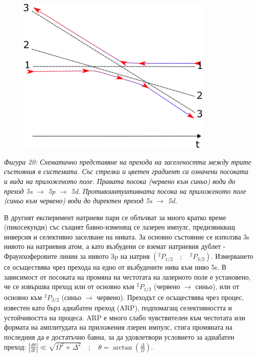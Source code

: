     \begin{figure}[H]
        \centering
        \includegraphics[width=270pt]{11.png}
    \end{figure}
    \begin{center}
        \small \textit{Фигура 20: Схематично представяне на прехода на заселеността между трите състояния в системата. Със стрелки и цветен градиент са означени посоката и вида
        на приложеното поле. Правата посока (червено към синьо) води до преход 5s $\rightarrow$ 5p $\rightarrow$ 5d. Противоинтуитивната посока на приложеното поле
        (синьо към червено) води до директен преход 5s $\rightarrow$ 5d.}\\
    \end{center}

    В другият експеримент натриеви пари се облъчват за много кратко време (пикосекунди) със същият бавно-изменящ се лазерен импулс, предизвикващ инверсия и селективно заселване на
    нивата. За основно състояние се използва 3s нивото на натриевия атом, а като възбудени се вземат натриевия дублет - Фраунхоферовите линии за нивото 3p на натрия $(^2P_{1/2} \quad ; \quad ^2P_{3/2})$.
    Измерването се осъществява чрез прехода на едно от възбудените нива към ниво 5s. В зависимост от посоката на промяна на честотата на лазерното поле е установено, че се извършва преход или от основно
    към $^2P_{1/2}$ (червено $\rightarrow$ синьо), или от основно към $^2P_{3/2}$ (синьо $\rightarrow$ червено). Преходът се осъществява чрез процес, известен като бърз адиабатен преход (ARP), подпомагащ
    селективността и устойчивостта на процеса. ARP е много слабо чувствителен към честотата или формата на амплитудата на приложения лзерен импулс, стига промяната на последния да е достатъчно бавна, за да
    удовлетвори условието за адиабатен преход: $\left|\frac{d\theta}{dt}\right|\ll \sqrt{\Omega^2 + \Delta^2} \quad ; \quad \theta = \arctan\left(\frac{\Delta}{\Omega}\right)$.

